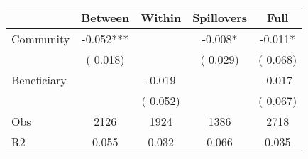 
\begin{tabular}{l*{4}{c}}\hline&\multicolumn{1}{c}{Between}&\multicolumn{1}{c}{Within}&\multicolumn{1}{c}{Spillovers}&\multicolumn{1}{c}{Full}\\ \hline
 Community             &             -0.052***      &                                               &       -0.008* &        -0.011*                            \\ 
                               &        (       0.018)           &                                       &       (       0.029)     &      (       0.068)                                           \\ 
 Beneficiary   &                                               &       -0.019    &                                &            -0.017                            \\ 
                               &                                               & (       0.052)                  &                                        &      (       0.067)                                           \\ 
\hline                                                                                                                                                                                                                                            
 Obs                   &               2126               &       1924                       &       1386                &              2718                                               \\ 
 R2                    &                      0.055              &              0.032                      &              0.066               &                     0.035                                              \\ 
\hline \end{tabular}                                                                                                                                                                                                              